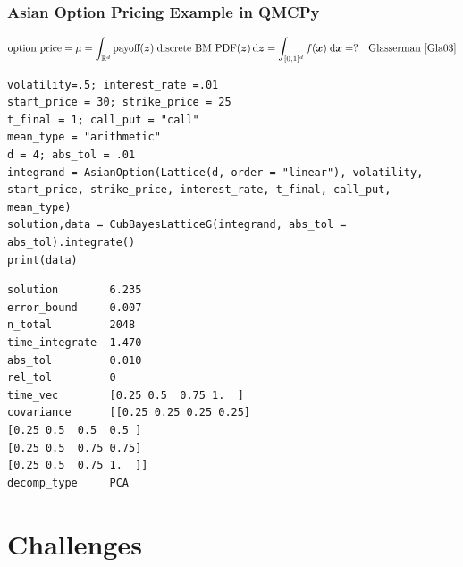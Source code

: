 \documentclass[11pt,compress,xcolor={usenames,dvipsnames},aspectratio=169]{beamer}
\begin{document}
\begin{frame}[fragile]\frametitle{Asian Option Pricing Example in QMCPy \href{https://colab.research.google.com/drive/1KrlrtLu7j8Ff7YsSJjPMiGUr-UKfqwxm?usp=sharing}{}}
	\vspace{-5ex}
	\[
	\text{option price} = \mu = \int_{\mathbb{R}^d} \text{payoff}(\boldsymbol{z}) \; \text{discrete BM PDF}(\boldsymbol{z})   \, {\rm d} \boldsymbol{z} = \int_{[0,1]^d} f(\boldsymbol{x}) \; {\rm d} \boldsymbol{x}  = ? \quad \text{Glasserman  \cite{Gla03}}
	\]
\noindent\begin{minipage}{0.52\textwidth}
\begin{lstlisting}[style=Python]
volatility=.5; interest_rate =.01
start_price = 30; strike_price = 25
t_final = 1; call_put = "call"
mean_type = "arithmetic"
d = 4; abs_tol = .01
integrand = AsianOption(Lattice(d, order = "linear"), volatility, start_price, strike_price, interest_rate, t_final, call_put, mean_type)
solution,data = CubBayesLatticeG(integrand, abs_tol = abs_tol).integrate()
print(data)
\end{lstlisting}
\end{minipage} 
\qquad
\begin{minipage}{0.42\textwidth}
\begin{lstlisting}[style=Python]
solution        6.235
error_bound     0.007
n_total         2048
time_integrate  1.470
abs_tol         0.010
rel_tol         0
time_vec        [0.25 0.5  0.75 1.  ]
covariance      [[0.25 0.25 0.25 0.25]
[0.25 0.5  0.5  0.5 ]
[0.25 0.5  0.75 0.75]
[0.25 0.5  0.75 1.  ]]
decomp_type     PCA
\end{lstlisting}
\end{minipage} 
	
\end{frame}


\section{Challenges}
\end{document}
